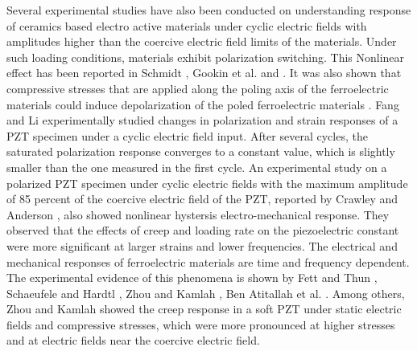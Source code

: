 Several experimental studies have also been conducted on understanding response of ceramics based electro active materials 
under cyclic electric fields with amplitudes higher than the coercive electric field limits of the materials. 
Under such loading conditions, materials exhibit polarization switching.
This Nonlinear effect has been reported in Schmidt \cite{schmidtcoercive1981}, Gookin et al. \cite{gookinelectro-optic1984} and \cite{raey}.  
It was also shown that compressive stresses that are applied along the poling axis of the ferroelectric materials could induce depolarization of the poled ferroelectric materials \cite{lynch1996effect, chena1998, raey}. 
Fang and Li \cite{raey} experimentally studied changes in polarization and strain responses of a PZT specimen under a cyclic electric field input. 
After several cycles, the saturated polarization response converges to a constant value, which is slightly smaller than the one measured in the first cycle. 
An experimental study on a polarized PZT specimen under cyclic electric fields with the maximum amplitude of 85 percent of the coercive electric field of the PZT, reported by Crawley and Anderson \cite{Crawley1990}, 
also showed nonlinear hystersis electro-mechanical response.  
They observed that the effects of creep and loading rate on the piezoelectric constant were more significant at larger strains and lower frequencies. 
The electrical and mechanical responses of ferroelectric materials are time and frequency dependent.
The experimental evidence of this phenomena is shown by Fett and Thun \cite{fettdetermination1998}, Schaeufele and Hardtl \cite{schaufele1996ferroelastic}, Zhou and Kamlah \cite{zhoudetermination2005,Zhou2006}, Ben Atitallah et al. \cite{atillah2014}.
Among others, Zhou and Kamlah \cite{zhoudetermination2005,Zhou2006} showed the creep response in a soft PZT under static electric fields and compressive stresses, which were more pronounced at higher stresses and at electric fields near the coercive electric field.

